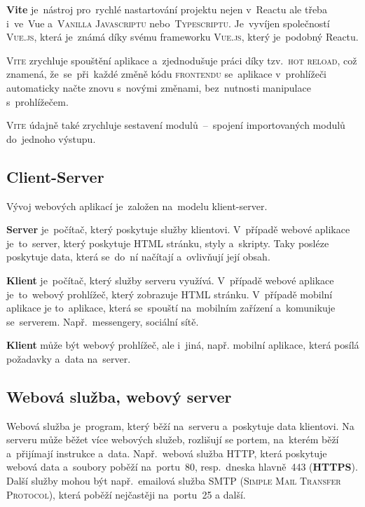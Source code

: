 \documentclass[14pt,a4paper]{article}
\begin{document}
        \textbf{Vite} je~nástroj pro~rychlé nastartování projektu nejen v~Reactu ale třeba i~ve~Vue a~\textsc{Vanilla Javascriptu} nebo~\textsc{Typescriptu}. Je~vyvíjen společností \textsc{Vue.js}, která je~známá díky svému frameworku \textsc{Vue.js}, který je~podobný Reactu.
        
        \textsc{Vite} zrychluje spouštění aplikace a~zjednodušuje práci díky tzv.~\textsc{hot reload}, což znamená, že~se~při~každé změně kódu \textsc{frontendu} se~aplikace v~prohlížeči automaticky načte znovu s~novými změnami, bez~nutnosti manipulace s~prohlížečem.
        
        \textsc{Vite} údajně také zrychluje sestavení modulů~--~spojení importovaných modulů do~jednoho výstupu.\parencite{vitejs}
        
        \subsection{Client-Server}
        Vývoj webových aplikací je~založen na~modelu klient-server.
        
        \textbf{Server} je~počítač, který poskytuje služby klientovi. V~případě webové aplikace je~to~server, který poskytuje HTML stránku, styly a~skripty.
        Taky posléze poskytuje data, která se~do~ní načítají a~ovlivňují její obsah.

        \textbf{Klient} je~počítač, který služby serveru využívá. V~případě webové aplikace je~to~webový prohlížeč, který zobrazuje HTML stránku.
        V~případě mobilní aplikace je to~aplikace, která se~spouští na~mobilním zařízení a~komunikuje se~serverem. Např.~messengery, sociální sítě. \parencite{ClientServer}
        
        \textbf{Klient} může být webový prohlížeč, ale i~jiná, např. mobilní aplikace, která posílá požadavky a~data na~server.

        \subsection{Webová služba, webový server}
        Webová služba je~program, který běží na~serveru a~poskytuje data klientovi. Na serveru může běžet více webových služeb, rozlišují se portem, na~kterém běží a~přijímají instrukce a~data. Např.~webová služba HTTP, která poskytuje webová data a~soubory poběží na~portu~80, resp.~dneska hlavně~443 (\textbf{HTTPS}). Další služby mohou být např.~emailová služba SMTP (\textsc{Simple Mail Transfer Protocol}), která poběží nejčastěji na~portu~25 a další.
        
\end{document}
